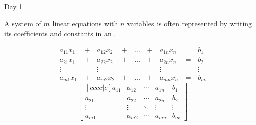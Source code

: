 \begin{applicationActivities}{Day 1}

\begin{definition}
  A system of \(m\) linear equations with \(n\) variables is often represented
  by writing its coefficients and constants in an .
  \begin{multicols}{2}\noindent
  \begin{alignat*}{5}
    a_{11}x_1 &\,+\,& a_{12}x_2 &\,+\,& \dots  &\,+\,& a_{1n}x_n &\,=\,& b_1 \\
    a_{21}x_1 &\,+\,& a_{22}x_2 &\,+\,& \dots  &\,+\,& a_{2n}x_n &\,=\,& b_2 \\
     \vdots&  &\vdots&   &&  &\vdots&&\vdots  \\
    a_{m1}x_1 &\,+\,& a_{m2}x_2 &\,+\,& \dots  &\,+\,& a_{mn}x_n &\,=\,& b_m
  \end{alignat*}
  \[
    \begin{bmatrix}[cccc|c]
      a_{11} & a_{12} & \cdots & a_{1n} & b_1\\
      a_{21} & a_{22} & \cdots & a_{2n} & b_2\\
      \vdots & \vdots & \ddots & \vdots & \vdots\\
      a_{m1} & a_{m2} & \cdots & a_{mn} & b_m
    \end{bmatrix}
  \]
  \end{multicols}
\end{definition}


\end{applicationActivities}
